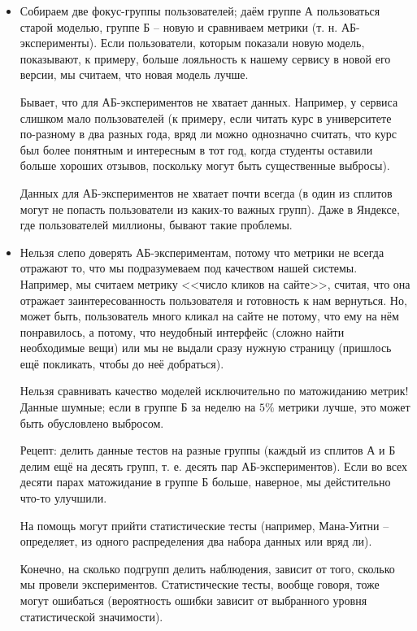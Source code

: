 \documentclass[main.tex]{subfiles}
\begin{document}
\begin{itemize}[noitemsep]
	\item Собираем две фокус-группы пользователей; даём группе А пользоваться старой моделью, группе Б -- новую и сравниваем метрики (т. н. АБ-эксперименты).
	Если пользователи, которым показали новую модель, показывают, к примеру, больше лояльность к нашему сервису в новой его версии, мы считаем, что новая модель лучше.


	Бывает, что для АБ-экспериментов не хватает данных.
	Например, у сервиса слишком мало пользователей (к примеру, если читать курс в университете по-разному в два разных года, вряд ли можно однозначно считать, что курс был более понятным и интересным в тот год, когда студенты оставили больше хороших отзывов, поскольку могут быть существенные выбросы).

	Данных для АБ-экспериментов не хватает почти всегда (в один из сплитов могут не попасть пользователи из каких-то важных групп).
	Даже в Яндексе, где пользователей миллионы, бывают такие проблемы.
	\item Нельзя слепо доверять АБ-экспериментам, потому что метрики не всегда отражают то, что мы подразумеваем под качеством нашей системы.
	Например, мы считаем метрику <<число кликов на сайте>>, считая, что она отражает заинтересованность пользователя и готовность к нам вернуться.
	Но, может быть, пользователь много кликал на сайте не потому, что ему на нём понравилось, а потому, что неудобный интерфейс (сложно найти необходимые вещи) или мы не выдали сразу нужную страницу (пришлось ещё покликать, чтобы до неё добраться).

	Нельзя сравнивать качество моделей исключительно по матожиданию метрик!
	Данные шумные; если в группе Б за неделю на $ 5\% $ метрики лучше, это может быть обусловлено выбросом.

	Рецепт: делить данные тестов на разные группы (каждый из сплитов А и Б делим ещё на десять групп, т. е. десять пар АБ-экспериментов).
	Если во всех десяти парах матожидание в группе Б больше, наверное, мы дейстительно что-то улучшили.

	На помощь могут прийти статистические тесты (например, Мана-Уитни -- определяет, из одного распределения два набора данных или вряд ли).

	Конечно, на сколько подгрупп делить наблюдения, зависит от того, сколько мы провели экспериментов.
	Статистические тесты, вообще говоря, тоже могут ошибаться (вероятность ошибки зависит от выбранного уровня статистической значимости).


\end{itemize}
\end{document}
